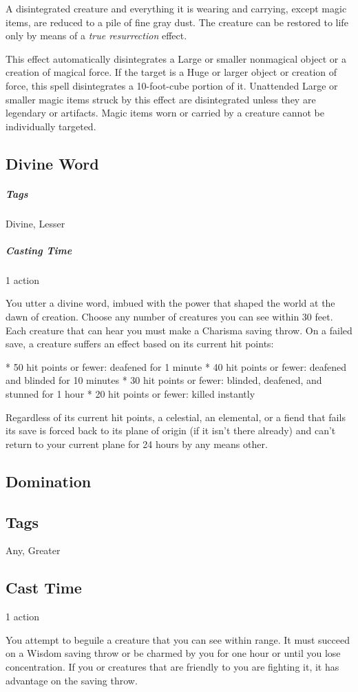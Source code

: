 A disintegrated creature and everything it is wearing and carrying, except magic items, are reduced to a pile of fine gray dust. The creature can be restored to life only by means of a \textit{true resurrection} effect.

This effect automatically disintegrates a Large or smaller nonmagical object or a creation of magical force. If the target is a Huge or larger object or creation of force, this spell disintegrates a 10-foot-cube portion of it. Unattended Large or smaller magic items struck by this effect are disintegrated unless they are legendary or artifacts. Magic items worn or carried by a creature cannot be individually targeted.

\subsection{Divine Word}
\subparagraph*{Tags} Divine, Lesser
\subparagraph*{Casting Time} 1 action

You utter a divine word, imbued with the power that shaped the world at the dawn of creation. Choose any number of creatures you can see within 30 feet. Each creature that can hear you must make a Charisma saving throw. On a failed save, a creature suffers an effect based on its current hit points:

* 50 hit points or fewer: deafened for 1 minute
* 40 hit points or fewer: deafened and blinded for 10 minutes
* 30 hit points or fewer: blinded, deafened, and stunned for 1 hour
* 20 hit points or fewer: killed instantly 

Regardless of its current hit points, a celestial, an elemental, or a fiend that fails its save is forced back to its plane of origin (if it isn’t there already) and can’t return to your current plane for 24 hours by any means other.

\subsection{Domination}
\subsection*{Tags} Any, Greater
\subsection*{Cast Time} 1 action

You attempt to beguile a creature that you can see within range. It must succeed on a Wisdom saving throw or be charmed by you for one hour or until you lose concentration. If you or creatures that are friendly to you are fighting it, it has advantage on the saving throw.


